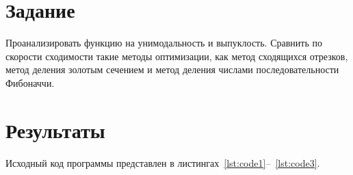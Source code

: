 \documentclass[a4paper, 14pt]{extarticle}
\begin{document}
\renewcommand{\ttdefault}{pcr}

\setlength{\tabcolsep}{3pt}
\newpage
\setcounter{page}{2}

\section{Задание}\label{Sect::task}

Проанализировать функцию на унимодальность и выпуклость.
Сравнить по скорости сходимости такие методы оптимизации, как метод сходящихся отрезков, метод деления золотым сечением и метод деления числами последовательности Фибоначчи.

\section{Результаты}\label{Sect::res}

Исходный код программы представлен в листингах~\ref{lst:code1}--~\ref{lst:code3}.
\end{document}
